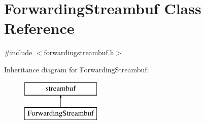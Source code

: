 \hypertarget{classstanfordcpplib_1_1ForwardingStreambuf}{}\section{Forwarding\+Streambuf Class Reference}
\label{classstanfordcpplib_1_1ForwardingStreambuf}


{\ttfamily \#include $<$forwardingstreambuf.\+h$>$}

Inheritance diagram for Forwarding\+Streambuf\+:\begin{figure}[H]
\begin{center}
\leavevmode
\includegraphics[height=2.000000cm]{classstanfordcpplib_1_1ForwardingStreambuf}
\end{center}
\end{figure}
